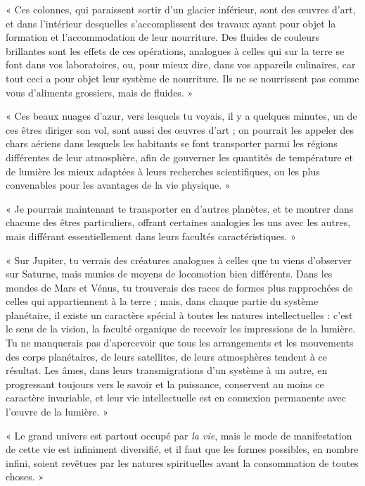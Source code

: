 \documentclass[a4paper, 11pt, oneside, landscape]{article}
\begin{document}
« Ces colonnes, qui paraissent sortir d'un glacier inférieur, sont des œuvres d'art, et dans l'intérieur desquelles s'accomplissent des travaux ayant pour objet la formation et l'accommodation de leur nourriture. Des fluides de couleurs brillantes sont les effets de ces opérations, analogues à celles qui sur la terre se font dans vos laboratoires, ou, pour mieux dire, dans vos appareils culinaires, car tout ceci a pour objet leur système de nourriture. Ils ne se nourrissent pas comme vous d'aliments grossiers, mais de fluides. »

« Ces beaux nuages d'azur, vers lesquels tu voyais, il y a quelques minutes, un de ces êtres diriger son vol, sont aussi des œuvres d'art ; on pourrait les appeler des chars aériens dans lesquels les habitants se font transporter parmi les régions différentes de leur atmosphère, afin de gouverner les quantités de température et de lumière les mieux adaptées à leurs recherches scientifiques, ou les plus convenables pour les avantages de la vie physique. »

« Je pourrais maintenant te transporter en d'autres planètes, et te montrer dans chacune des êtres particuliers, offrant certaines analogies les uns avec les autres, mais différant essentiellement dans leurs facultés caractéristiques. »

« Sur Jupiter, tu verrais des créatures analogues à celles que tu viens d'observer sur Saturne, mais munies de moyens de locomotion bien différents. Dans les mondes de Mars et Vénus, tu trouverais des races de formes plus rapprochées de celles qui appartiennent à la terre ; mais, dans chaque partie du système planétaire, il existe un caractère spécial à toutes les natures intellectuelles : c'est le sens de la vision, la faculté organique de recevoir les impressions de la lumière. Tu ne manquerais pas d'apercevoir que tous les arrangements et les mouvements des corps planétaires, de leurs satellites, de leurs atmosphères tendent à ce résultat. Les âmes, dans leurs transmigrations d'un système à un autre, en progressant toujours vers le savoir et la puissance, conservent au moins ce caractère invariable, et leur vie intellectuelle est en connexion permanente avec l'œuvre de la lumière. »

« Le grand univers est partout occupé par \emph{la vie}, mais le mode de manifestation de cette vie est infiniment diversifié, et il faut que les formes possibles, en nombre infini, soient revêtues par les natures spirituelles avant la consommation de toutes choses. »
\end{document}

